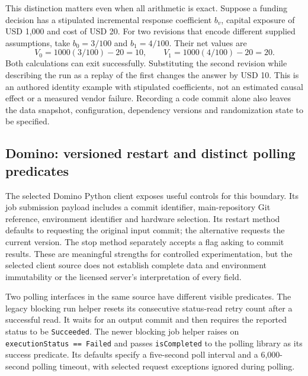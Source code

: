 This distinction matters even when all arithmetic is exact. Suppose a
funding decision has a stipulated incremental response coefficient $b_v$,
capital exposure of USD 1,000 and cost of USD 20. For two revisions that
encode different supplied assumptions, take $b_0=3/100$ and $b_1=4/100$.
Their net values are
\begin{equation}
 V_0=1000(3/100)-20=10,\qquad
 V_1=1000(4/100)-20=20.
 \label{exec23:clients-revision}
\end{equation}
Both calculations can exit successfully. Substituting the second revision
while describing the run as a replay of the first changes the answer by
USD 10. This is an authored identity example with stipulated coefficients,
not an estimated causal effect or a measured vendor failure. Recording a
code commit alone also leaves the data snapshot, configuration, dependency
versions and randomization state to be specified.
\citep{exec23_workflow_client_reference}

\subsection{Domino: versioned restart and distinct polling predicates}
\label{exec23:clients-domino}

The selected Domino Python client exposes useful controls for this boundary.
Its job submission payload includes a commit identifier, main-repository Git
reference, environment identifier and hardware selection. Its restart method
defaults to requesting the original input commit; the alternative requests
the current version. The stop method separately accepts a flag asking to
commit results. These are meaningful strengths for controlled experimentation,
but the selected client source does not establish complete data and environment
immutability or the licensed server's interpretation of every field.
\citep{exec23_workflow_dominopy}

Two polling interfaces in the same source have different visible predicates.
The legacy blocking run helper resets its consecutive status-read retry count
after a successful read. It waits for an output commit and then requires the
reported status to be \texttt{Succeeded}. The newer blocking job helper
raises on \texttt{executionStatus == Failed} and passes
\texttt{isCompleted} to the polling library as its success predicate. Its
defaults specify a five-second poll interval and a 6,000-second polling
timeout, with selected request exceptions ignored during polling.
\citep{exec23_workflow_dominopy}

